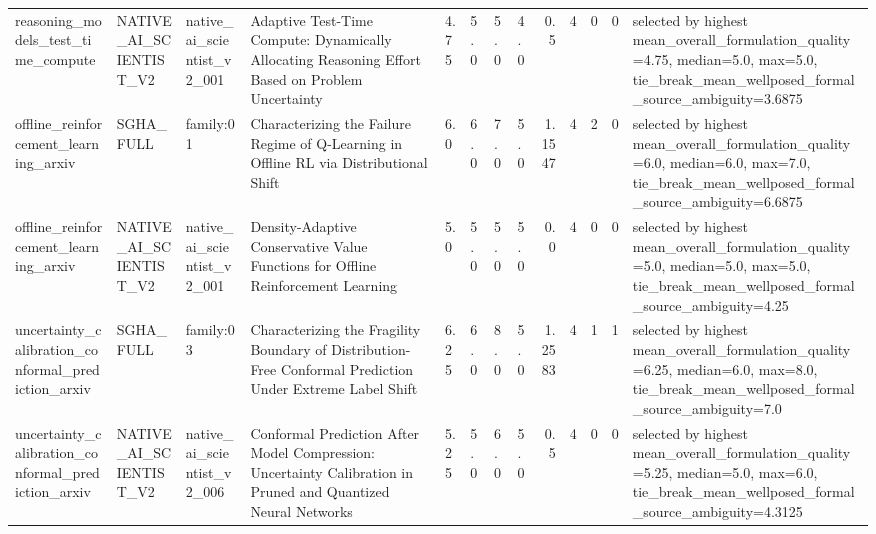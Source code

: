 \begin{table}[htbp]
\begin{tabular}{llllllllrrrrl}
reasoning\_models\_test\_time\_compute & NATIVE\_AI\_SCIENTIST\_V2 & native\_ai\_scientist\_v2\_001 & Adaptive Test-Time Compute: Dynamically Allocating Reasoning Effort Based on Problem Uncertainty & 4.75 & 5.0 & 5.0 & 4.0 & 0.5 & 4 & 0 & 0 & selected by highest mean\_overall\_formulation\_quality=4.75, median=5.0, max=5.0, tie\_break\_mean\_wellposed\_formal\_source\_ambiguity=3.6875 \\
offline\_reinforcement\_learning\_arxiv & SGHA\_FULL & family:01 & Characterizing the Failure Regime of Q-Learning in Offline RL via Distributional Shift & 6.0 & 6.0 & 7.0 & 5.0 & 1.1547 & 4 & 2 & 0 & selected by highest mean\_overall\_formulation\_quality=6.0, median=6.0, max=7.0, tie\_break\_mean\_wellposed\_formal\_source\_ambiguity=6.6875 \\
offline\_reinforcement\_learning\_arxiv & NATIVE\_AI\_SCIENTIST\_V2 & native\_ai\_scientist\_v2\_001 & Density-Adaptive Conservative Value Functions for Offline Reinforcement Learning & 5.0 & 5.0 & 5.0 & 5.0 & 0.0 & 4 & 0 & 0 & selected by highest mean\_overall\_formulation\_quality=5.0, median=5.0, max=5.0, tie\_break\_mean\_wellposed\_formal\_source\_ambiguity=4.25 \\
uncertainty\_calibration\_conformal\_prediction\_arxiv & SGHA\_FULL & family:03 & Characterizing the Fragility Boundary of Distribution-Free Conformal Prediction Under Extreme Label Shift & 6.25 & 6.0 & 8.0 & 5.0 & 1.2583 & 4 & 1 & 1 & selected by highest mean\_overall\_formulation\_quality=6.25, median=6.0, max=8.0, tie\_break\_mean\_wellposed\_formal\_source\_ambiguity=7.0 \\
uncertainty\_calibration\_conformal\_prediction\_arxiv & NATIVE\_AI\_SCIENTIST\_V2 & native\_ai\_scientist\_v2\_006 & Conformal Prediction After Model Compression: Uncertainty Calibration in Pruned and Quantized Neural Networks & 5.25 & 5.0 & 6.0 & 5.0 & 0.5 & 4 & 0 & 0 & selected by highest mean\_overall\_formulation\_quality=5.25, median=5.0, max=6.0, tie\_break\_mean\_wellposed\_formal\_source\_ambiguity=4.3125 \\
\bottomrule
\end{tabular}
\end{table}

